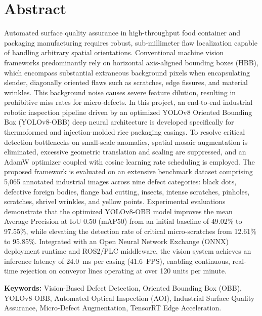 \chapter*{Abstract}
\justifying
Automated surface quality assurance in high-throughput food container and packaging manufacturing requires robust, sub-millimeter flaw localization capable of handling arbitrary spatial orientations. Conventional machine vision frameworks predominantly rely on horizontal axis-aligned bounding boxes (HBB), which encompass substantial extraneous background pixels when encapsulating slender, diagonally oriented flaws such as scratches, edge fissures, and material wrinkles. This background noise causes severe feature dilution, resulting in prohibitive miss rates for micro-defects. In this project, an end-to-end industrial robotic inspection pipeline driven by an optimized YOLOv8 Oriented Bounding Box (YOLOv8-OBB) deep neural architecture is developed specifically for thermoformed and injection-molded rice packaging casings. To resolve critical detection bottlenecks on small-scale anomalies, spatial mosaic augmentation is eliminated, excessive geometric translation and scaling are suppressed, and an AdamW optimizer coupled with cosine learning rate scheduling is employed. The proposed framework is evaluated on an extensive benchmark dataset comprising 5,065 annotated industrial images across nine defect categories: black dots, defective foreign bodies, flange bad cutting, insects, intense scratches, pinholes, scratches, shrivel wrinkles, and yellow points. Experimental evaluations demonstrate that the optimized YOLOv8-OBB model improves the mean Average Precision at IoU 0.50 (mAP50) from an initial baseline of 49.02\% to 97.55\%, while elevating the detection rate of critical micro-scratches from 12.61\% to 95.85\%. Integrated with an Open Neural Network Exchange (ONNX) deployment runtime and ROS2/PLC middleware, the vision system achieves an inference latency of 24.0~ms per casing (41.6~FPS), enabling continuous, real-time rejection on conveyor lines operating at over 120 units per minute.

\vspace{12pt}
\noindent\textbf{Keywords:} Vision-Based Defect Detection, Oriented Bounding Box (OBB), YOLOv8-OBB, Automated Optical Inspection (AOI), Industrial Surface Quality Assurance, Micro-Defect Augmentation, TensorRT Edge Acceleration.
\clearpage

